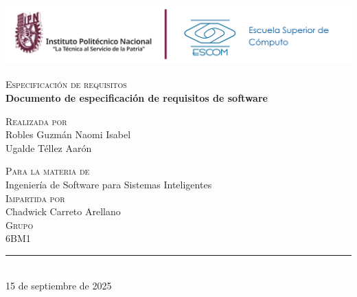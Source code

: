 \begin{titlepage}
  \thispagestyle{empty}
  \pagecolor{white}
  
  \begin{center}
    \vspace{1cm}
    
   
      \centering
          \vspace{2cm}
      \includegraphics[height=2.35cm]{img/logos.png}
    
    \vspace{3cm}
    
    {\normalsize\color{charcoal}\textsc{Especificación de requisitos}}\\[0.5cm]
    
    {\huge\bfseries\color{black}Documento de especificación de requisitos de software}\\[0.5cm]

    
    \vspace{1.5cm}
    
    {\small\color{charcoal}\textsc{Realizada por}}\\[0.3cm]
    
    {\normalsize\color{black}Robles Guzmán Naomi Isabel}\\[0.2cm]
    {\normalsize\color{black}Ugalde Téllez Aarón}\\[0.5cm]

    
    \vspace{0.8cm}
    
    {\small\color{charcoal}\textsc{Para la materia de}}\\[0.2cm]
    {\normalsize\color{blue}Ingeniería de Software para Sistemas Inteligentes}\\[0.5cm]
    
    {\small\color{charcoal}\textsc{Impartida por}}\\[0.2cm]
    {\normalsize\color{black}Chadwick Carreto Arellano}\\[0.5cm]
    
    {\small \color{charcoal}\textsc{Grupo}}\\[0.3cm]
    {\normalsize\color{black}6BM1}\\[0.8cm]
    
    \vfill
    
    {\color{blue}\rule{0.4\textwidth}{1pt}}\\[0.3cm]
    {\large\color{charcoal}15 de septiembre de 2025}
    
    \vspace{1cm}
    
  \end{center}
\end{titlepage}